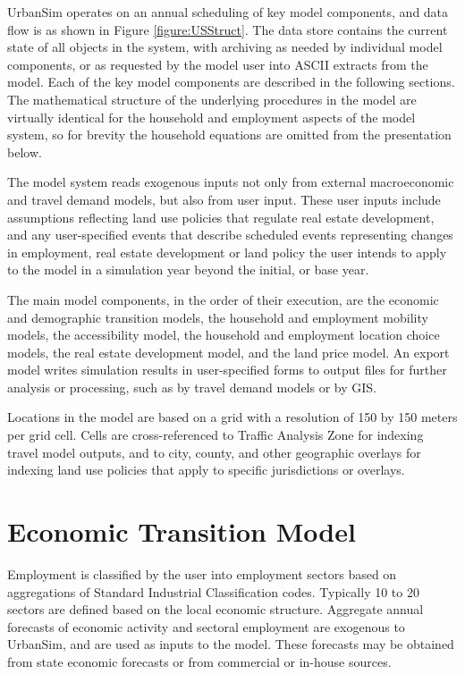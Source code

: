UrbanSim operates on an annual scheduling of key model components,
and data flow is as shown in Figure \ref{figure:USStruct}.  The data
store contains the current state of all objects in the system,
with archiving as needed by individual model components, or as
requested by the model user into ASCII extracts from the model.
Each of the key model components are described in the following
sections.  The mathematical structure of the underlying procedures
in the model are virtually identical for the household and
employment aspects of the model system, so for brevity the
household equations are omitted from the presentation below.

The model system reads exogenous inputs not only from external
macroeconomic and travel demand models, but also from user input.
These user inputs include assumptions reflecting land use policies
that regulate real estate development, and any user-specified
events that describe scheduled events representing changes in
employment, real estate development or land policy the user
intends to apply to the model in a simulation year beyond the
initial, or base year.

The main model components, in the order of their execution, are
the economic and demographic transition models, the household and
employment mobility models, the accessibility model, the household
and employment location choice models, the real estate development
model, and the land price model.  An export model writes
simulation results in user-specified forms to output files for
further analysis or processing, such as by travel demand models or
by GIS.

Locations in the model are based on a grid with a resolution of
150 by 150 meters per grid cell.  Cells are cross-referenced to
Traffic Analysis Zone for indexing travel model outputs, and to
city, county, and other geographic overlays for indexing land use
policies that apply to specific jurisdictions or overlays.

\section{Economic Transition Model}
Employment is classified by the user into employment sectors based
on aggregations of Standard Industrial Classification codes.
Typically 10 to 20 sectors are defined based on the local economic
structure. Aggregate annual forecasts of economic activity and sectoral
employment are exogenous to UrbanSim, and are used as inputs to
the model. These forecasts may be obtained from state economic
forecasts or from commercial or in-house sources.

